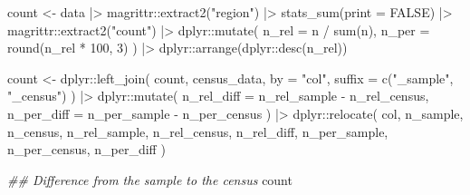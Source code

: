 \documentclass[
  12pt,
  a4paper,
  oneside]{tesesusp}
\newenvironment{Shaded}{\begin{snugshade}}{\end{snugshade}}
\newcommand{\AttributeTok}[1]{\textcolor[rgb]{0.40,0.45,0.13}{#1}}
\newcommand{\ConstantTok}[1]{\textcolor[rgb]{0.56,0.35,0.01}{#1}}
\newcommand{\DecValTok}[1]{\textcolor[rgb]{0.68,0.00,0.00}{#1}}
\newcommand{\DocumentationTok}[1]{\textcolor[rgb]{0.37,0.37,0.37}{\textit{#1}}}
\newcommand{\FunctionTok}[1]{\textcolor[rgb]{0.28,0.35,0.67}{#1}}
\newcommand{\NormalTok}[1]{\textcolor[rgb]{0.00,0.23,0.31}{#1}}
\newcommand{\OtherTok}[1]{\textcolor[rgb]{0.00,0.23,0.31}{#1}}
\newcommand{\SpecialCharTok}[1]{\textcolor[rgb]{0.37,0.37,0.37}{#1}}
\newcommand{\StringTok}[1]{\textcolor[rgb]{0.13,0.47,0.30}{#1}}
\begin{document}
\begin{Shaded}
\begin{Highlighting}[numbers=left,,]
\NormalTok{count }\OtherTok{\textless{}{-}}\NormalTok{ data }\SpecialCharTok{|\textgreater{}} 
\NormalTok{  magrittr}\SpecialCharTok{::}\FunctionTok{extract2}\NormalTok{(}\StringTok{"region"}\NormalTok{) }\SpecialCharTok{|\textgreater{}}
  \FunctionTok{stats\_sum}\NormalTok{(}\AttributeTok{print =} \ConstantTok{FALSE}\NormalTok{) }\SpecialCharTok{|\textgreater{}}
\NormalTok{  magrittr}\SpecialCharTok{::}\FunctionTok{extract2}\NormalTok{(}\StringTok{"count"}\NormalTok{) }\SpecialCharTok{|\textgreater{}}
\NormalTok{  dplyr}\SpecialCharTok{::}\FunctionTok{mutate}\NormalTok{(}
    \AttributeTok{n\_rel =}\NormalTok{ n }\SpecialCharTok{/} \FunctionTok{sum}\NormalTok{(n),}
    \AttributeTok{n\_per =} \FunctionTok{round}\NormalTok{(n\_rel }\SpecialCharTok{*} \DecValTok{100}\NormalTok{, }\DecValTok{3}\NormalTok{)}
\NormalTok{    ) }\SpecialCharTok{|\textgreater{}}
\NormalTok{  dplyr}\SpecialCharTok{::}\FunctionTok{arrange}\NormalTok{(dplyr}\SpecialCharTok{::}\FunctionTok{desc}\NormalTok{(n\_rel))}

\NormalTok{count }\OtherTok{\textless{}{-}} 
\NormalTok{  dplyr}\SpecialCharTok{::}\FunctionTok{left\_join}\NormalTok{(}
\NormalTok{    count, census\_data, }\AttributeTok{by =} \StringTok{"col"}\NormalTok{, }\AttributeTok{suffix =} \FunctionTok{c}\NormalTok{(}\StringTok{"\_sample"}\NormalTok{, }\StringTok{"\_census"}\NormalTok{)}
\NormalTok{  ) }\SpecialCharTok{|\textgreater{}}
\NormalTok{  dplyr}\SpecialCharTok{::}\FunctionTok{mutate}\NormalTok{(}
    \AttributeTok{n\_rel\_diff =}\NormalTok{ n\_rel\_sample }\SpecialCharTok{{-}}\NormalTok{ n\_rel\_census,}
    \AttributeTok{n\_per\_diff =}\NormalTok{ n\_per\_sample }\SpecialCharTok{{-}}\NormalTok{ n\_per\_census}
\NormalTok{  ) }\SpecialCharTok{|\textgreater{}}
\NormalTok{  dplyr}\SpecialCharTok{::}\FunctionTok{relocate}\NormalTok{(}
\NormalTok{    col, n\_sample, n\_census, n\_rel\_sample, n\_rel\_census, n\_rel\_diff,}
\NormalTok{    n\_per\_sample, n\_per\_census, n\_per\_diff}
\NormalTok{  )}

\DocumentationTok{\#\# Difference from the sample to the census}
\NormalTok{count}
\end{Highlighting}
\end{Shaded}
\end{document}
